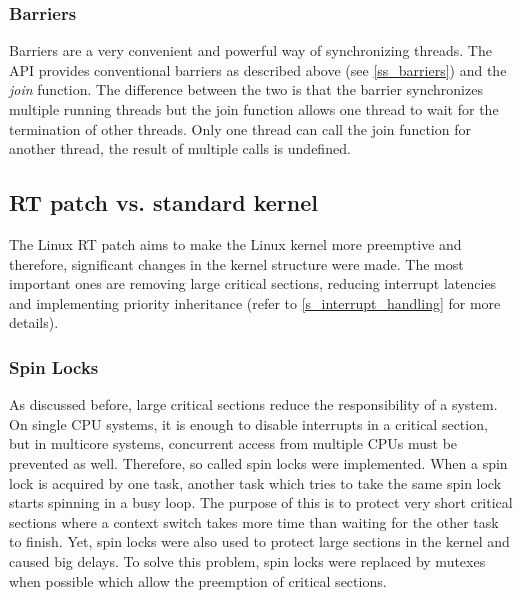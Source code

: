 \subsubsection{Barriers}
Barriers are a very convenient and powerful way of synchronizing threads. 
The \ac{API} provides conventional barriers as described above (see \ref{ss_barriers}) and the \textit{join} function.
The difference between the two is that the barrier synchronizes multiple running threads but the join function allows one thread to wait for the termination of other threads.
Only one thread can call the join function for another thread, the result of multiple calls is undefined.

\subsection{RT patch vs. standard kernel}
The Linux RT patch aims to make the Linux kernel more preemptive and therefore, significant changes in the kernel structure were made.
The most important ones are removing large critical sections, reducing interrupt latencies and implementing priority inheritance (refer to \ref{s_interrupt_handling} for more details).

\subsubsection{Spin Locks}
As discussed before, large critical sections reduce the responsibility of a system.
On single \ac{CPU} systems, it is enough to disable interrupts in a critical section, but in multicore systems, concurrent access from multiple \acp{CPU} must be prevented as well.
Therefore, so called spin locks were implemented. 
When a spin lock is acquired by one task, another task which tries to take the same spin lock starts spinning in a busy loop.
The purpose of this is to protect very short critical sections where a context switch takes more time than waiting for the other task to finish.
Yet, spin locks were also used to protect large sections in the kernel and caused big delays.
To solve this problem, spin locks were replaced by mutexes when possible which allow the preemption of critical sections.   

